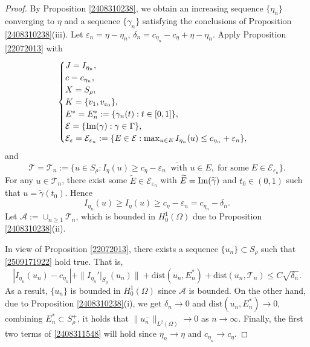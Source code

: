 \documentclass[10pt]{article}
\numberwithin{equation}{section}
\numberwithin{equation}{section}
\begin{document}
\begin{proof}
By Proposition \ref{2408310238}, we obtain an increasing sequence $\{\eta_n\}$ converging to $\eta$ and a sequence $\{\gamma_n\}$ satisfying the conclusions of Proposition \ref{2408310238}(iii). Let $\varepsilon_n=\eta-\eta_n$, $\delta_n=c_{\eta_n}-c_{\eta}+\eta-\eta_n$. Apply Proposition \ref{22072013} with
\[
 \begin{cases}
 J=I_{\eta_n},\\
  c=c_{\eta_n},\\
  X=S_\rho,\\
   K=\{v_1, v_{\varepsilon_0}\},\\
    E^*=E_n^*:=\{\gamma_n(t): t\in [0,1]\},\\
        \mathcal{E}=\{{\rm Im}(\gamma): {\gamma}\in\Gamma\}, \\
     \mathcal{E}_{\varepsilon}=\mathcal{E}_{\varepsilon_n}:=\{E\in\mathcal{E}: \max_{u\in E}I_{\eta_n}(u)\le c_{\eta_n}+\varepsilon_n\},
 \end{cases}
 \]
 and
\[
\mathcal{T}=\mathcal{T}_n:=\overline{\{u\in S_\rho: I_{\eta}(u)\ge c_\eta-\varepsilon_n\;\;\mbox{with } u\in E,\;\mbox{for some}\; E\in\mathcal{E}_{\varepsilon_n}\}}.
\]
For any $u\in \mathcal{T}_{n}$, there exist some $\widetilde{E}\in \mathcal{E}_{\varepsilon_n}$ with $\widetilde{E}={\rm Im}(\widetilde{\gamma})$ and $t_0\in (0, 1)$ such that $u=\widetilde{\gamma}(t_0)$. Hence
 \[
I_{\eta_n}(u)\ge I_{\eta}(u)\ge c_\eta-\varepsilon_n=c_{\eta_n}-\delta_n.
 \]
 Let $\mathcal{A}:=\cup_{n\ge 1}\mathcal{T}_n$, which is  bounded in $H_0^1(\Omega)$ due to Proposition \ref{2408310238}(ii).

In view of Proposition \ref{22072013},  there exists a sequence $\{u_n\}\subset S_\rho$ such that \eqref{2509171922} hold true. That is,
\begin{equation}\label{2505221203}
| I_{\eta_n}(u_n)-c_{\eta_n}|+\|I_{\eta_n}'|_{S_\rho}(u_n)\|+\text{dist}(u_n, E_n^*)+\mbox{dist}(u_n, \mathcal{T}_n)\le C\sqrt{\delta_n}.
\end{equation}
As a result, $\{u_n\}$ is bounded in $H_0^1(\Omega)$ since $\mathcal{A}$ is  bounded. On the other hand, due to Proposition \ref{2408310238}(i), we get $\delta_n\to 0$ and $\text{dist}(u_n, E_n^*)\to 0$,  combining $E_n^*\subset S_\rho^+$,  it holds that $\|u_n^{-}\|_{L^2(\Omega)}\to 0$ as $n\to\infty$. Finally, the first two terms of \eqref{2408311548} will hold since $\eta_n\to\eta$ and $c_{\eta_n}\to c_\eta$.
\end{proof}
\end{document}
